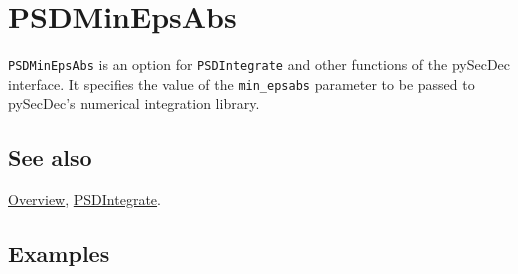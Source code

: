 \documentclass[../FeynHelpersManual.tex]{subfiles}
\begin{document}
\hypertarget{psdminepsabs}{
\section{PSDMinEpsAbs}\label{psdminepsabs}}

\texttt{PSDMinEpsAbs} is an option for \texttt{PSDIntegrate} and other
functions of the pySecDec interface. It specifies the value of the
\texttt{min_epsabs} parameter to be passed to pySecDec's numerical
integration library.

\subsection{See also}

\hyperlink{toc}{Overview}, \hyperlink{psdintegrate}{PSDIntegrate}.

\subsection{Examples}
\end{document}
